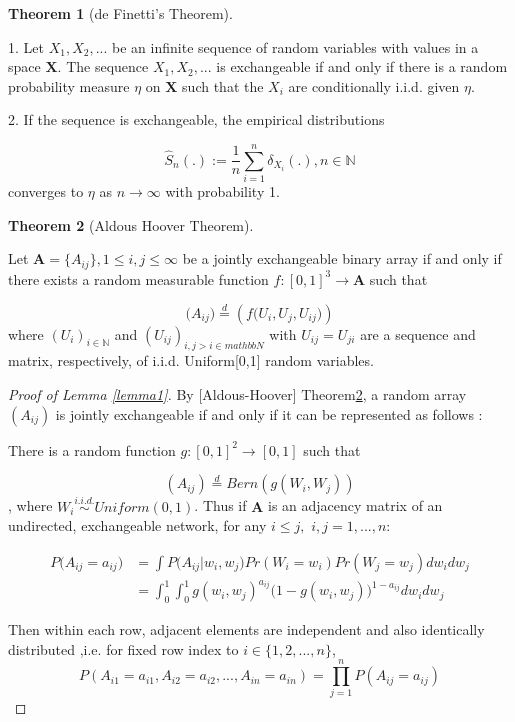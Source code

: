 \documentclass[12pt]{article}
\theoremstyle{definition}
\newtheorem{theorem}{Theorem}[section]
\begin{document}
\begin{theorem}[de Finetti's Theorem] 
		\label{finetti}
		
1. Let $X_{1}, X_{2}, ...$ be an infinite sequence of random variables with values in a space $\mathbf{X}$. The sequence $X_{1}, X_{2}, ...$ is exchangeable if and only if there is a random probability measure $\eta$ on $\mathbf{X}$ such that the $X_{i}$ are conditionally i.i.d. given $\eta$. 
		
2. If the sequence is exchangeable, the empirical distributions
		
$$\hat{S}_{n} ( . ) := \frac{1}{n} \sum\limits_{i=1}^{n} \delta_{X_{i}} ( .), n \in \mathbb{N}$$
		converges to $\eta$ as $n \rightarrow \infty$ with probability 1.
\end{theorem}
	
\begin{theorem}[Aldous Hoover Theorem]
		\label{Aldous_Hoover}
		
		Let $\mathbf{A} = \{A_{ij}\}, 1 \leq i,j \leq \infty$ be a jointly exchangeable binary array if and only if there exists a random measurable function $f : [0,1]^{3} \rightarrow \mathbf{A}$ such that 
		
		\begin{equation}
		\big(  A_{ij}  \big) \stackrel{d}{=} \left( f \big( U_{i}, U_{j}, U_{ij} \big)  \right)
		\end{equation}
		where $(U_{i})_{i \in \mathbb{N}}$ and $(U_{ij})_{i,j > i \in mathbb{N}}$ with $U_{ij} = U_{ji}$ are a sequence and matrix, respectively, of i.i.d. Uniform[0,1] random variables. 
\end{theorem}
	
	
	
	\begin{proof}[Proof of Lemma \ref{lemma1}]
		By [Aldous-Hoover] Theorem\ref{Aldous_Hoover}, a random array $(A_{ij})$ is jointly exchangeable if and only if it can be represented as follows : 
		
		There is a random function $g : [0,1]^2 \rightarrow [0,1]$ such that 
		
		$$(A_{ij})  \stackrel{d}{=} Bern( g(W_{i}, W_{j}))$$
		, where $W_{i} \overset{i.i.d.}{\sim} Uniform(0,1)$. Thus if $\mathbf{A}$ is an adjacency matrix of an undirected, exchangeable network, for any $i \leq j,$ $i,j = 1,... , n$:
		
		
		\begin{equation}
		\begin{split}
		P \big(  A_{ij} = a_{ij} \big) & = \int P \big( A_{ij} \big| w_{i}, w_{j} \big) Pr(W_{i} = w_{i}) Pr(W_{j} = w_{j}) dw_{i} dw_{j} \\ & = \int_{0}^{1} \int_{0}^{1} g( w_{i},  w_{j})^{a_{ij}} \big( 1- g( w_{i},  w_{j}) \big)^{1-a_{ij}} dw_{i} dw_{j} 
		\end{split}
		\end{equation}
		
		Then within each row, adjacent elements are independent and also identically distributed ,i.e. for fixed row index to $i \in \{1,2,... , n\}$,
		$$P(A_{i1} = a_{i1}, A_{i2} = a_{i2}, ... , A_{in} = a_{in} ) = \prod\limits_{j=1}^{n} P(A_{ij} = a_{ij})$$
		
	\end{proof}
	
\end{document}
